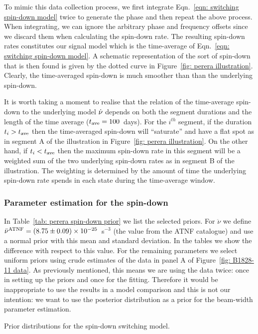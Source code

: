 \documentclass[../full_thesis/full_thesis.tex]{subfiles}
\newcommand{\thisdir}{../comparing_periodic_modulations}
\begin{document}
To mimic this data collection process, we first integrate Eqn.~\eqref{eqn:
switching spin-down model} twice to generate the phase and then repeat the
above process.  When integrating, we can ignore the arbitrary phase and
frequency offsets since we discard them when calculating the spin-down rate.
The resulting spin-down rates constitutes our signal model which is the
time-average of Eqn.~\eqref{eqn: switching spin-down model}.  A schematic
representation of the sort of spin-down that is then found is given by the
dotted curve in Figure~\ref{fig: perera illustration}.  Clearly, the
time-averaged spin-down is much smoother than than the underlying spin-down.


It is worth taking a moment to realise that the relation of the time-average
spin-down to the underlying model $\dot{\nu}$ depends on both the segment
durations and the length of the time average ($t_{\mathrm{ave}}=100$~days). For the
$i^{th}$ segment, if the duration $t_{i} > t_{\mathrm{ave}}$ then the time-averaged
spin-down will ``saturate'' and have a flat spot as in segment A of the
illustration in Figure~\ref{fig: perera illustration}. On the other hand, if
$t_{i} < t_{\mathrm{ave}}$ then the maximum spin-down rate in this segment will be a
weighted sum of the two underlying spin-down rates as in segment B of the
illustration. The weighting is determined by the amount of time the underlying
spin-down rate spends in each state during the time-average window.


\subsubsection{Parameter estimation for the spin-down}

In Table~\ref{tab: perera spin-down prior} we list the selected priors. For
$\ddot{\nu}$ we define
$\ddot{\nu}^{\tiny\mathrm{ATNF}}=(8.75\pm0.09)\times10^{-25}$~s$^{-3}$ (the
value from the ATNF catalogue) and use a normal prior with this mean and
standard deviation. In the tables we show the difference with respect to this
value. For the remaining parameters we select uniform priors using
crude estimates of the data in panel A of Figure~\ref{fig: B1828-11 data}.
As previously mentioned, this means we are using the
data twice: once in setting up the priors and once for the fitting. Therefore
it would be inappropriate to use the results in a model comparison and this is
not our intention: we want to use the posterior distribution as a prior for the
beam-width parameter estimation.
\begin{table}
\centering
\caption{Prior distributions for the spin-down switching model.}
\label{tab: perera spin-down prior}

\end{table}
\end{document}

